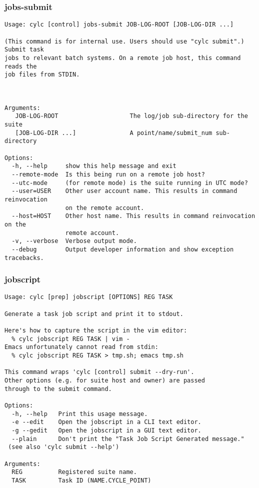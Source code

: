 \subsubsection{jobs-submit}
\label{jobs-submit}
\begin{lstlisting}
Usage: cylc [control] jobs-submit JOB-LOG-ROOT [JOB-LOG-DIR ...]

(This command is for internal use. Users should use "cylc submit".) Submit task
jobs to relevant batch systems. On a remote job host, this command reads the
job files from STDIN.



Arguments:
   JOB-LOG-ROOT                    The log/job sub-directory for the suite
   [JOB-LOG-DIR ...]               A point/name/submit_num sub-directory

Options:
  -h, --help     show this help message and exit
  --remote-mode  Is this being run on a remote job host?
  --utc-mode     (for remote mode) is the suite running in UTC mode?
  --user=USER    Other user account name. This results in command reinvocation
                 on the remote account.
  --host=HOST    Other host name. This results in command reinvocation on the
                 remote account.
  -v, --verbose  Verbose output mode.
  --debug        Output developer information and show exception tracebacks.
\end{lstlisting}
\subsubsection{jobscript}
\label{jobscript}
\begin{lstlisting}
Usage: cylc [prep] jobscript [OPTIONS] REG TASK

Generate a task job script and print it to stdout.

Here's how to capture the script in the vim editor:
  % cylc jobscript REG TASK | vim -
Emacs unfortunately cannot read from stdin:
  % cylc jobscript REG TASK > tmp.sh; emacs tmp.sh

This command wraps 'cylc [control] submit --dry-run'.
Other options (e.g. for suite host and owner) are passed
through to the submit command.

Options:
  -h, --help   Print this usage message.
  -e --edit    Open the jobscript in a CLI text editor.
  -g --gedit   Open the jobscript in a GUI text editor.
  --plain      Don't print the "Task Job Script Generated message."
 (see also 'cylc submit --help')

Arguments:
  REG          Registered suite name.
  TASK         Task ID (NAME.CYCLE_POINT)
\end{lstlisting}
